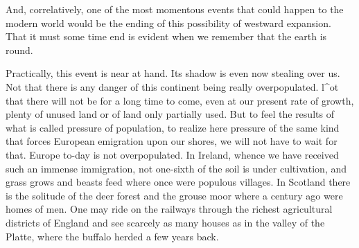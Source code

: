 \documentclass{book}
\begin{document}
And, correlatively, one of the most momentous events that could happen to the modern world would be the ending of this possibility of westward expansion. That it must some time end is evident when we remember that the earth is round.

Practically, this event is near at hand. Its shadow is even now stealing over us. Not that there is any danger of this continent being really overpopulated. l\textasciicircum{}ot that there will not be for a long time to come, even at our present rate of growth, plenty of unused land or of land only partially used. But to feel the results of what is called pressure of population, to realize here pressure of the same kind that forces European emigration upon our shores, we will not have to wait for that. Europe to-day is not overpopulated. In Ireland, whence we have received such an immense immigration, not one-sixth of the soil is under cultivation, and grass grows and beasts feed where once were populous villages. In Scotland there is the solitude of the deer forest and the grouse moor where a century ago were homes of men. One may ride on the railways through the richest agricultural districts of England and see scarcely as many houses as in the valley of the Platte, where the buffalo herded a few years back.
\end{document}
